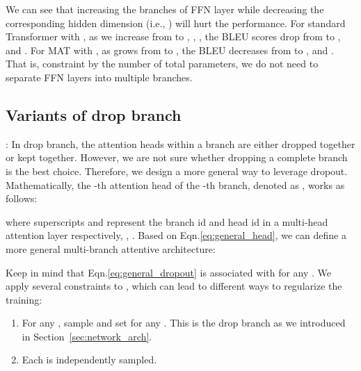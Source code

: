 \documentclass{article}
\begin{document}
We can see that increasing the branches of FFN layer while decreasing the corresponding hidden dimension (i.e., ) will hurt the performance. For standard Transformer with , as we increase  from  to , , , the BLEU scores drop from  to ,  and . For MAT with , as  grows from  to , the BLEU decreases from  to ,  and . That is, constraint by the number of total parameters, we do not need to separate FFN layers into multiple branches.



\subsection{Variants of drop branch}


: In drop branch, the attention heads within a branch are either dropped together or kept together. However, we are not sure whether dropping a complete branch is the best choice. Therefore, we design a more general way to leverage dropout. Mathematically, the -th attention head of the -th branch, denoted as , works as follows:

where superscripts  and  represent the branch id and head id in a multi-head attention layer respectively, , . Based on Eqn.\eqref{eq:general_head}, we can define a more general multi-branch attentive architecture:

Keep in mind that Eqn.\eqref{eq:general_dropout} is associated with  for any . We apply several constraints to , which can lead to different ways to regularize the training:
\begin{enumerate}
\item For any , sample  and set  for any . This is the drop branch as we introduced in Section~\ref{sec:network_arch}.\item Each  is independently sampled.\end{enumerate}

\iffalse
\begin{figure}[!htbp]
	\centering
	\subfigure[Drop a complete branch.]{
		\texttt{[image: figures/dropout\_branch.png]}
	}
\subfigure[Randomly drop heads.]{
		\texttt{[image: figures/dropout\_head\_rand.png]}
	}
	\caption{Variants of drop branch. In this figure, we show a -branch -head multi-branch attention. In each figure, the bottom row represents input and top row is the output. Red dashed lines represented dropped parts, i.e., vectors with all elements zero.}
	\label{fig:diff_dropout_scheme}
\end{figure}
\fi
\end{document}
